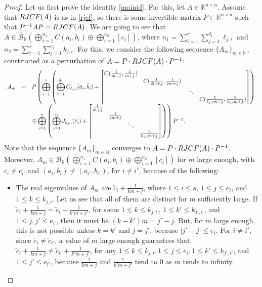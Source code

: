 \documentclass[10pt,a4paper]{amsart}
\newcommand{\R}{\mathbb R}
\newcommand{\bunr}{{\mathcal B}_{\R}}
\newcommand{\cbunr}{{\overline{\mathcal B}}_{\R}}
\begin{document}
\begin{proof}
    Let us first prove the identity \eqref{mainid}. For this, let $A\in\R^{n\times n}$. Assume that ${\rm RJCF}(A)$ is as in \eqref{rjcf}, so there is some invertible matrix $P\in\R^{n\times n}$ such that $P^{-1}AP={\rm RJCF}(A)$. We are going to see that $A\in \cbunr \left(\bigoplus_{i=1}^{n_1}C(a_i,b_i)\oplus \bigoplus_{i=1}^{n_2}[c_i]\right)$, where $n_1=\sum_{i=1}^r\sum_{j=1}^{d_i}\ell_{j,i}$ and $n_2=\sum_{i=1}^s\sum_{j=1}^{e_i}k_{j,i}$. For this, we consider the following sequence $\{ A_m \}_{m \in \mathbb{N}}$, constructed as a perturbation of $A = P\cdot{\rm RJCF}(A)\cdot P^{-1}$:
    $$
    \begin{array}{ccl}
    A_m&=&P\left(\displaystyle\displaystyle\bigoplus_{i=1}^r\left(\bigoplus_{j=1}^{d_i}C_{\ell_{j,i}}(\tilde a_i, \tilde b_i)+\begin{bmatrix}
        C(\frac{1}{m+j},\frac{1}{m+j})\\&C(\frac{1}{2m+j},\frac{1}{2m+j})\\&&\ddots\\&&&C(\frac{1}{\ell_{j,i}m+j},\frac{1}{\ell_{j,i}m+j})
    \end{bmatrix}\right)\right.\\&&\left.\displaystyle\oplus \bigoplus_{i=1}^s\left(\bigoplus_{j=1}^{e_i} J_{k_{j,i}} (\tilde c_i) +\begin{bmatrix}
        \frac{1}{m+j}\\&\frac{1}{2m+j}\\&&\ddots\\&&&\frac{1}{k_{j,i}m+j}
    \end{bmatrix}\right)\right)P^{-1}.
    \end{array}
    $$
Note that the sequence $\{A_m\}_{m\in\mathbb N}$ converges to $A = P\cdot {\rm RJCF}(A)\cdot P^{-1}$. Moreover, $A_m\in \bunr \left(\bigoplus_{i=1}^{n_1}C(a_i,b_i)\oplus \bigoplus_{i=1}^{n_2}[c_i]\right)$ for $m$ large enough, with $c_i\neq c_{i'}$ and $(a_i , b_i) \neq (a_{i'}, b_{i'})$, for $i\neq i'$, because of the following:
\begin{itemize}
    \item The real eigenvalues of $A_m$ are $ \tilde c_i+\frac{1}{km+j}$, where $1 \leq i \leq s$, $1\leq j\leq e_i$, and $1\leq k\leq k_{j,i}$. Let us see that all of them are distinct for $m$ sufficiently large. If $\tilde c_i+\frac{1}{km+j}=  \tilde c_i+\frac{1}{k'm+j'}$, for some $1\leq k \leq k_{j,i}\,$,  $1\leq k'\leq k_{j',i}\,$, and $1\leq j,j'\leq e_i\,$, then it must be $(k-k')m=j'-j$. But, for $m$ large enough, this is not possible unless $k=k'$ and $j=j'$, because  $|j'-j|\leq e_i$. For $i\neq i'$, since $\tilde c_i\neq \tilde c_{i'}$, a value of $m$ large enough guarantees that $\tilde c_i+\frac{1}{km+j}\neq \tilde c_{i'}+\frac{1}{k'm+j'}$, for any $1\leq k\leq k_{j,i},1\leq j\leq e_i,1\leq k'\leq k_{j',i'}$, and $1\leq j'\leq e_{i'}$, because $\frac{1}{km+j}$ and $\frac{1}{k'm+j'}$ tend to $0$ as $m$ tends to infinity.

\end{itemize}
\end{proof}
\end{document}
